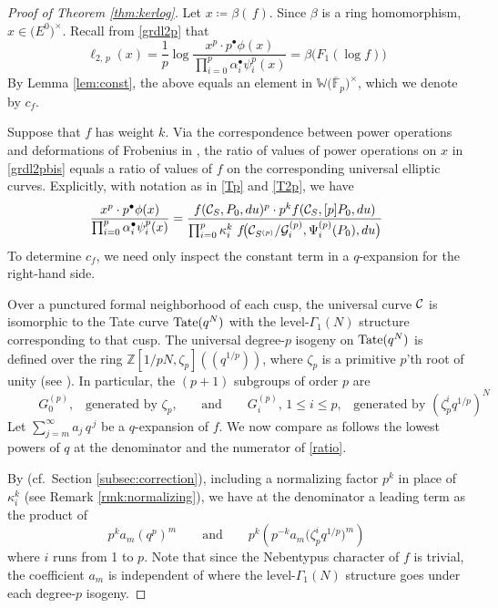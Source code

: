 \documentclass{gtpart}
\theoremstyle{definition}
\theoremstyle{remark}
\newcommand{\mb}[1]{\mathbb{#1}}
\newcommand{\cF}{\overline {\mb F}}
\newcommand{\CC}{{\cal C}}
\newcommand{\CG}{{\cal G}}
\newcommand{\BW}{{\mb W}}
\newcommand{\BZ}{{\mb Z}}
\newcommand{\ad}{\text{and}}
\newcommand{\A}{\alpha}
\newcommand{\B}{\beta}
\newcommand{\G}{\Gamma}
\newcommand{\K}{\kappa}
\newcommand{\ce}{\coloneqq}
\newcommand{\lp}{(\!(}
\newcommand{\rp}{)\!)}
\renewcommand{\=}{\approx}
\renewcommand{\-}{\sim}
\newcommand{\Tate}{{\rm Tate}}
\numberwithin{equation}{section}
\begin{document}
\begin{proof}[Proof of Theorem \ref{thm:kerlog}]
 Let $x \ce \B(\,f)$.  Since $\B$ is a ring homomorphism, 
 $x \in \big( E^0 \big)^{\!\times}$.  Recall from \eqref{grdl2p} that 
 \begin{equation}
  \label{grdl2pbis}
  \ell_{2,\,p}(x) = \frac{1}{p} \log 
  \frac{x^p \cdot p^\bullet \phi(x)}{\prod_{i=0}^p \A_i^\bullet \psi^p_i(x)} = 
  \B \big( F_1(\log f) \big) 
 \end{equation}
 By Lemma \ref{lem:const}, the above equals an element in 
 $\BW \big( \cF_p \big)^{\!\times}$, which we denote by $c_f$.  

 Suppose that $f$ has weight $k$.  Via the correspondence between power 
 operations and deformations of Frobenius in \cite[Theorem B]{cong}, the ratio 
 of values of power operations on $x$ in \eqref{grdl2pbis} equals a ratio of 
 values of $f$ on the corresponding universal elliptic curves.  Explicitly, with 
 notation as in \eqref{Tp} and \eqref{T2p}, we have 
 \begin{equation}
  \label{ratio}
  \frac{x^p \cdot p^\bullet \phi(x)}{\prod_{i=0}^p \A_i^\bullet \psi^p_i(x)} = 
  \frac{f(\CC_S, P_0, du)^p \cdot p^k f(\CC_S, [p] P_0, du)}{\prod_{i=0}^p 
  \K_i^k ~ f\!\big(\CC_{S^{(p)}}/\CG^{(p)}_i, \Psi^{(p)}_i(P_0), du\big)} 
 \end{equation}
 To determine $c_f$, we need only inspect the constant term in a $q$-expansion 
 for the right-hand side.  

 Over a punctured formal neighborhood of each cusp, the universal curve $\CC$ is 
 isomorphic to the Tate curve $\Tate(q^N)$ with the level-$\G_1(N)$ structure 
 corresponding to that cusp.  The universal degree-$p$ isogeny on $\Tate(q^N)$ 
 is defined over the ring $\BZ [1/pN, \zeta_p] \lp q^{1/p} \rp$, where $\zeta_p$ 
 is a primitive $p$'th root of unity (see 
 \cite[Sections 1.2, 1.4, and 1.11]{padicprop}).  In particular, the $(p + 1)$ 
 subgroups of order $p$ are 
 \[
  \qquad~~ \text{$G^{(p)}_0$,~~~generated by $\zeta_p$,} \qquad \ad \qquad 
  \text{$G^{(p)}_i$, $1 \leq i \leq p$,~~~generated by $(\zeta_p^i q^{1/p})^N$} 
 \]
 Let $\sum_{j = m}^\infty a_j \, q^{\,j}$ be a $q$-expansion of $f$.  We now 
 compare as follows the lowest powers of $q$ at the denominator and the 
 numerator of \eqref{ratio}.  

 By \cite[(1.11.0.3) and (1.11.0.4)]{padicprop} (cf.~Section 
 \ref{subsec:correction}), including a normalizing factor $p^k$ in place of 
 $\K_i^k$ (see Remark \ref{rmk:normalizing}), we have at the denominator a 
 leading term as the product of 
 \[
  p^k a_m (q^p)^m \qquad \ad \qquad p^k \left( p^{-k} a_m \big( \zeta_p^i 
  q^{1/p} \big)^m \right) 
 \]
 where $i$ runs from 1 to $p$.  Note that since the Nebentypus character of $f$ 
 is trivial, the coefficient $a_m$ is independent of where the level-$\G_1(N)$ 
 structure goes under each degree-$p$ isogeny.  


\end{proof}
\end{document}
